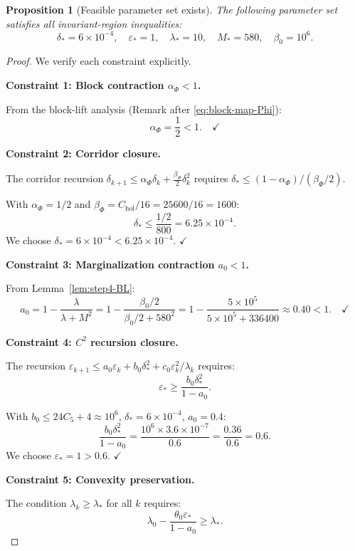 \documentclass[11pt]{article}
\newtheorem{proposition}[theorem]{Proposition}
\theoremstyle{definition}
\newcommand{\1}{\mathbf{1}}
\begin{document}
\begin{proposition}[Feasible parameter set exists]\label{prop:step5-closure}
The following parameter set satisfies all invariant-region inequalities:
\begin{equation}\label{eq:step5-parameters}
\boxed{
\delta_* = 6 \times 10^{-4}, \quad \varepsilon_* = 1, \quad \lambda_* = 10, \quad M_* = 580, \quad \beta_0 = 10^6.
}
\end{equation}
\end{proposition}

\begin{proof}
We verify each constraint explicitly.

\textbf{Constraint 1: Block contraction $\alpha_\Phi < 1$.}

From the block-lift analysis (Remark after \eqref{eq:block-map-Phi}):
\[
\alpha_\Phi = \frac{1}{2} < 1. \quad \checkmark
\]

\textbf{Constraint 2: Corridor closure.}

The corridor recursion $\delta_{k+1} \le \alpha_\Phi \delta_k + \frac{\beta_\Phi}{2} \delta_k^2$ 
requires $\delta_* \le (1 - \alpha_\Phi)/(\beta_\Phi/2)$.

With $\alpha_\Phi = 1/2$ and $\beta_\Phi = C_{\text{hol}}/16 = 25600/16 = 1600$:
\[
\delta_* \le \frac{1/2}{800} = 6.25 \times 10^{-4}.
\]
We choose $\delta_* = 6 \times 10^{-4} < 6.25 \times 10^{-4}$. $\checkmark$

\textbf{Constraint 3: Marginalization contraction $a_0 < 1$.}

From Lemma~\ref{lem:step4-BL}:
\[
a_0 = 1 - \frac{\lambda}{\lambda + M^2} = 1 - \frac{\beta_0/2}{\beta_0/2 + 580^2} 
= 1 - \frac{5 \times 10^5}{5 \times 10^5 + 336400} \approx 0.40 < 1. \quad \checkmark
\]

\textbf{Constraint 4: $C^2$ recursion closure.}

The recursion $\varepsilon_{k+1} \le a_0 \varepsilon_k + b_0 \delta_*^2 + c_0 \varepsilon_k^2/\lambda_k$ 
requires:
\[
\varepsilon_* \ge \frac{b_0 \delta_*^2}{1 - a_0}.
\]

With $b_0 \le 24 C_5 + 4 \approx 10^6$, $\delta_* = 6 \times 10^{-4}$, $a_0 = 0.4$:
\[
\frac{b_0 \delta_*^2}{1 - a_0} = \frac{10^6 \times 3.6 \times 10^{-7}}{0.6} = \frac{0.36}{0.6} = 0.6.
\]
We choose $\varepsilon_* = 1 > 0.6$. $\checkmark$

\textbf{Constraint 5: Convexity preservation.}

The condition $\lambda_k \ge \lambda_*$ for all $k$ requires:
\[
\lambda_0 - \frac{\theta_0 \varepsilon_*}{1 - a_0} \ge \lambda_*.
\]


\end{proof}
\end{document}

